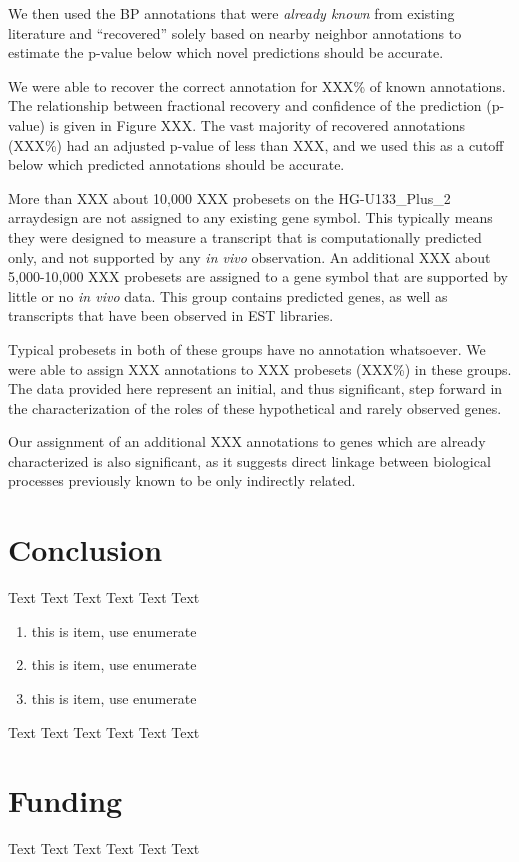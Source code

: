 \documentclass{bioinfo}
\begin{document}
We then used the BP annotations that were \emph{already known} from existing
literature and ``recovered'' solely based on nearby neighbor annotations to
estimate the p-value below which novel predictions should be accurate.

We were able to recover the correct annotation for XXX\% of known annotations.
The relationship between fractional recovery and confidence of the prediction
(p-value) is given in Figure XXX.  The vast majority of recovered annotations
(XXX\%) had an adjusted p-value of less than XXX, and we used this as a cutoff
below which predicted annotations should be accurate.

More than XXX about 10,000 XXX probesets on the HG-U133\_Plus\_2 arraydesign are not
assigned to any existing gene symbol.  This typically means they were designed
to measure a transcript that is computationally predicted only, and not
supported by any \emph{in vivo} observation.  An additional XXX about
5,000-10,000 XXX probesets are assigned to a gene symbol that are supported by
little or no \emph{in vivo} data.  This group contains predicted genes, as well
as transcripts that have been observed in EST libraries.

Typical probesets in both of these groups have no annotation whatsoever.  We
were able to assign XXX annotations to XXX probesets (XXX\%) in these groups.
The data provided here represent an initial, and thus significant, step forward
in the characterization of the roles of these hypothetical and rarely observed
genes.

Our assignment of an additional XXX annotations to genes which are already
characterized is also significant, as it suggests direct linkage between
biological processes previously known to be only indirectly related.

\section{Conclusion}
Text Text Text Text Text Text

\begin{enumerate}
\item this is item, use enumerate 
\item this is item, use enumerate 
\item this is item, use enumerate 
\end{enumerate}

Text Text Text Text Text Text

\section*{Funding}
Text Text Text Text Text Text
\end{document}
